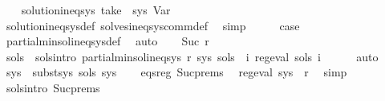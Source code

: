 \begin{isabellebody}
\ \ \isamarkupfalse%
\ {\isachardoublequoteopen}solution{\isacharunderscore}{\kern0pt}ineq{\isacharunderscore}{\kern0pt}sys\ {\isacharparenleft}{\kern0pt}take\ {}\ sys{\isacharparenright}{\kern0pt}\ Var{\isachardoublequoteclose}\isanewline
\ \ \ \ \isamarkupfalse%
\ solution{\isacharunderscore}{\kern0pt}ineq{\isacharunderscore}{\kern0pt}sys{\isacharunderscore}{\kern0pt}def\ solves{\isacharunderscore}{\kern0pt}ineq{\isacharunderscore}{\kern0pt}sys{\isacharunderscore}{\kern0pt}comm{\isacharunderscore}{\kern0pt}def\ \isamarkupfalse%
\ simp\isanewline
\ \ \isamarkupfalse%
\ \isamarkupfalse%
\ {\isacharquery}{\kern0pt}case\ \isamarkupfalse%
\ partial{\isacharunderscore}{\kern0pt}min{\isacharunderscore}{\kern0pt}sol{\isacharunderscore}{\kern0pt}ineq{\isacharunderscore}{\kern0pt}sys{\isacharunderscore}{\kern0pt}def\ \isamarkupfalse%
\ auto\isanewline
{}\isamarkupfalse%
\isanewline
\ \ \isamarkupfalse%
\ {\isacharparenleft}{\kern0pt}Suc\ r{\isacharparenright}{\kern0pt}\isanewline
\ \ \isamarkupfalse%
\ \isamarkupfalse%
\ sols\ \ sols{\isacharunderscore}{\kern0pt}intro{\isacharcolon}{\kern0pt}\ {\isachardoublequoteopen}partial{\isacharunderscore}{\kern0pt}min{\isacharunderscore}{\kern0pt}sol{\isacharunderscore}{\kern0pt}ineq{\isacharunderscore}{\kern0pt}sys\ r\ sys\ sols\ {\isasymand}\ {\isacharparenleft}{\kern0pt}{\isasymforall}i{\isachardot}{\kern0pt}\ reg{\isacharunderscore}{\kern0pt}eval\ {\isacharparenleft}{\kern0pt}sols\ i{\isacharparenright}{\kern0pt}{\isacharparenright}{\kern0pt}{\isachardoublequoteclose}\isanewline
\ \ \ \ \isamarkupfalse%
\ auto\isanewline
\isanewline
\ \ \isamarkupfalse%
\ {\isacharquery}{\kern0pt}sys{\isacharprime}{\kern0pt}\ {\isacharequal}{\kern0pt}\ {\isachardoublequoteopen}subst{\isacharunderscore}{\kern0pt}sys\ sols\ sys{\isachardoublequoteclose}\isanewline
\ \ \isamarkupfalse%
\ eqs{\isacharunderscore}{\kern0pt}reg\ Suc{\isachardot}{\kern0pt}prems\ \isamarkupfalse%
\ {\isachardoublequoteopen}reg{\isacharunderscore}{\kern0pt}eval\ {\isacharparenleft}{\kern0pt}sys\ {\isacharbang}{\kern0pt}\ r{\isacharparenright}{\kern0pt}{\isachardoublequoteclose}\ \isamarkupfalse%
\ simp\isanewline
\ \ \isamarkupfalse%
\ sols{\isacharunderscore}{\kern0pt}intro\ Suc{\isachardot}{\kern0pt}prems\ \isamarkupfalse%

\end{isabellebody}
